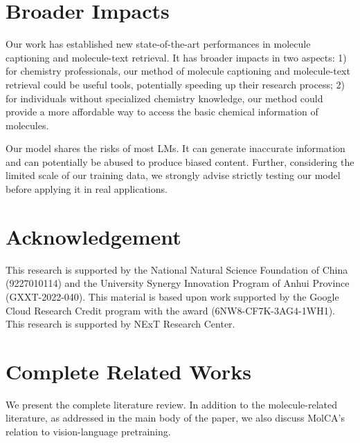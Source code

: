 \documentclass[11pt]{article}
\begin{document}
\section*{Broader Impacts}
Our work has established new state-of-the-art performances in molecule captioning and molecule-text retrieval. It has broader impacts in two aspects: 1) for chemistry professionals, our method of molecule captioning and molecule-text retrieval could be useful tools, potentially speeding up their research process;
2) for individuals without specialized chemistry knowledge, our method could provide a more affordable way to access the basic chemical information of molecules. 

Our model shares the risks of most LMs. It can generate inaccurate information and can potentially be abused to produce biased content. Further, considering the limited scale of our training data, we strongly advise strictly testing our model before applying it in real applications.

\section*{Acknowledgement}
This research is supported by the National Natural Science Foundation of China (9227010114) and the University Synergy Innovation Program of Anhui Province (GXXT-2022-040). This material is based upon work supported by the Google Cloud Research Credit program with the award (6NW8-CF7K-3AG4-1WH1). This research is supported by NExT Research Center. 


 










\clearpage
\newpage
\appendix


\section{Complete Related Works}
\label{app:related_works}
We present the complete literature review. In addition to the molecule-related literature, as addressed in the main body of the paper, we also discuss MolCA's relation to vision-language pretraining. 
\end{document}
